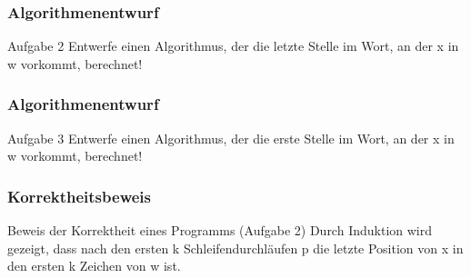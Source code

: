 \begin{frame}
	\frametitle{Algorithmenentwurf}
	\begin{block}{Aufgabe 2}
		Entwerfe einen Algorithmus, der die letzte Stelle im Wort, an der x in w vorkommt, berechnet!
	\end{block}
\end{frame}

\begin{frame}
	\frametitle{Algorithmenentwurf}
	\begin{block}{Aufgabe 3}
		Entwerfe einen Algorithmus, der die erste Stelle im Wort, an der x in w vorkommt, berechnet!
	\end{block}

\end{frame}

\begin{frame}
	\frametitle{Korrektheitsbeweis}
	\begin{block}{Beweis der Korrektheit eines Programms (Aufgabe 2)}
		Durch Induktion wird gezeigt, dass nach den ersten k Schleifendurchläufen p die letzte Position von x in den ersten k Zeichen von w ist.
	\end{block}
\end{frame}


